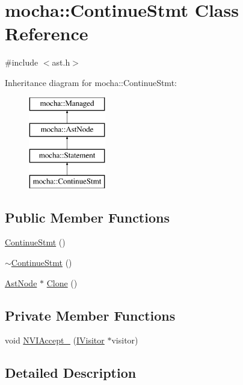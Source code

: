 \hypertarget{classmocha_1_1_continue_stmt}{
\section{mocha::ContinueStmt Class Reference}
\label{classmocha_1_1_continue_stmt}
}


{\ttfamily \#include $<$ast.h$>$}

Inheritance diagram for mocha::ContinueStmt:\begin{figure}[H]
\begin{center}
\leavevmode
\includegraphics[height=4.000000cm]{classmocha_1_1_continue_stmt}
\end{center}
\end{figure}
\subsection*{Public Member Functions}
\begin{DoxyCompactItemize}
\item 
\hyperlink{classmocha_1_1_continue_stmt_a2d8841d776f5989c5578ff348f52a424}{ContinueStmt} ()
\item 
\hyperlink{classmocha_1_1_continue_stmt_aa5af4afde4e3c8073e2adccc3d195ffa}{$\sim$ContinueStmt} ()
\item 
\hyperlink{classmocha_1_1_ast_node}{AstNode} $\ast$ \hyperlink{classmocha_1_1_continue_stmt_a0a2ccd62452d6cee52724db3c6e28c21}{Clone} ()
\end{DoxyCompactItemize}
\subsection*{Private Member Functions}
\begin{DoxyCompactItemize}
\item 
void \hyperlink{classmocha_1_1_continue_stmt_ae8cbf571d917e7b8002b3b9614b6f92e}{NVIAccept\_\-} (\hyperlink{classmocha_1_1_i_visitor}{IVisitor} $\ast$visitor)
\end{DoxyCompactItemize}


\subsection{Detailed Description}


